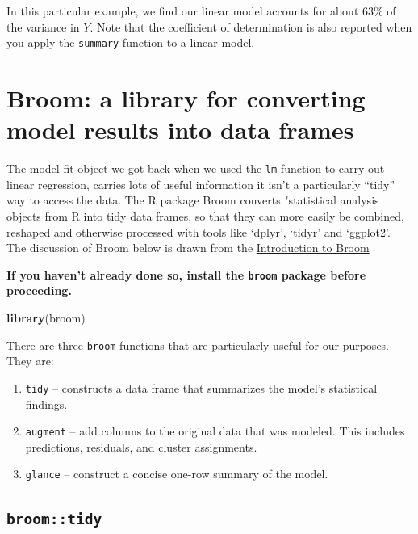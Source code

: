 \documentclass[]{book}
\newenvironment{Shaded}{\begin{snugshade}}{\end{snugshade}}
\newcommand{\KeywordTok}[1]{\textcolor[rgb]{0.13,0.29,0.53}{\textbf{#1}}}
\newcommand{\NormalTok}[1]{#1}
\providecommand{\tightlist}{%
  \setlength{\itemsep}{0pt}\setlength{\parskip}{0pt}}
\theoremstyle{definition}
\theoremstyle{definition}
\theoremstyle{definition}
\theoremstyle{remark}
\begin{document}
In this particular example, we find our linear model accounts for about
63\% of the variance in \(Y\). Note that the coefficient of
determination is also reported when you apply the \texttt{summary}
function to a linear model.

\hypertarget{broom-a-library-for-converting-model-results-into-data-frames}{%
\section{Broom: a library for converting model results into data
frames}\label{broom-a-library-for-converting-model-results-into-data-frames}}

The model fit object we got back when we used the \texttt{lm} function
to carry out linear regression, carries lots of useful information it
isn't a particularly ``tidy'' way to access the data. The R package
Broom converts "statistical analysis objects from R into tidy data
frames, so that they can more easily be combined, reshaped and otherwise
processed with tools like `dplyr', `tidyr' and `ggplot2'. The discussion
of Broom below is drawn from the
\href{https://cran.r-project.org/web/packages/broom/vignettes/broom.html}{Introduction
to Broom}

\textbf{If you haven't already done so, install the \texttt{broom}
package before proceeding.}

\begin{Shaded}
\begin{Highlighting}[]
\KeywordTok{library}\NormalTok{(broom)}
\end{Highlighting}
\end{Shaded}

There are three \texttt{broom} functions that are particularly useful
for our purposes. They are:

\begin{enumerate}
\def\labelenumi{\arabic{enumi}.}
\tightlist
\item
  \texttt{tidy} -- constructs a data frame that summarizes the model's
  statistical findings.
\item
  \texttt{augment} -- add columns to the original data that was modeled.
  This includes predictions, residuals, and cluster assignments.
\item
  \texttt{glance} -- construct a concise one-row summary of the model.
\end{enumerate}

\hypertarget{broomtidy}{%
\subsection{\texorpdfstring{\texttt{broom::tidy}}{broom::tidy}}\label{broomtidy}}
\end{document}
